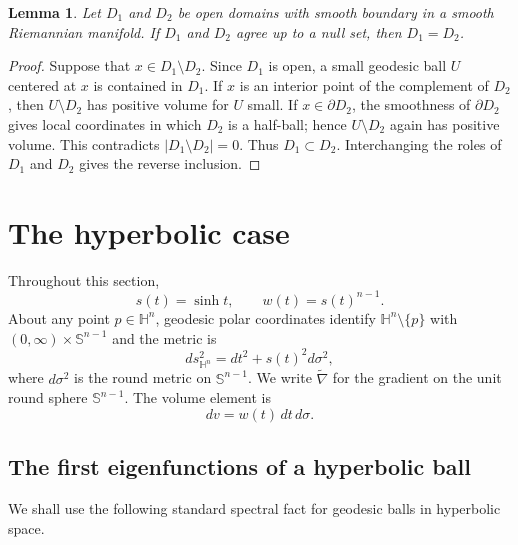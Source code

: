 \documentclass[11pt]{amsart}
\newtheorem{lemma}[theorem]{Lemma}
\theoremstyle{remark}
\newcommand{\HH}{\mathbb H}
\newcommand{\Sn}{\mathbb S}
\begin{document}
\begin{lemma}\label{lem:ae-domain-equality}
Let $D_1$ and $D_2$ be open domains with smooth boundary in a smooth Riemannian manifold.  If $D_1$ and $D_2$ agree up to a null set, then $D_1=D_2$.
\end{lemma}

\begin{proof}
Suppose that $x\in D_1\setminus D_2$.  Since $D_1$ is open, a small geodesic ball $U$ centered at $x$ is contained in $D_1$.  If $x$ is an interior point of the complement of $D_2$, then $U\setminus D_2$ has positive volume for $U$ small.  If $x\in\partial D_2$, the smoothness of $\partial D_2$ gives local coordinates in which $D_2$ is a half-ball; hence $U\setminus D_2$ again has positive volume.  This contradicts $|D_1\setminus D_2|=0$.  Thus $D_1\subset D_2$.  Interchanging the roles of $D_1$ and $D_2$ gives the reverse inclusion.
\end{proof}

\section{The hyperbolic case}\label{sec3}

Throughout this section,
$$
        s(t)=\sinh t,
        \qquad
        w(t)=s(t)^{n-1}.
$$
About any point $p\in\HH^n$, geodesic polar coordinates identify $\HH^n\setminus\{p\}$ with $(0,\infty)\times\Sn^{n-1}$ and the metric is
\begin{equation}\label{eq:hyperbolic-polar-metric}
        ds_{\HH^n}^2=dt^2+s(t)^2d\sigma^2,
\end{equation}
where $d\sigma^2$ is the round metric on $\Sn^{n-1}$.  We write $\widetilde\nabla$ for the gradient on the unit round sphere $\Sn^{n-1}$.  The volume element is
$$
        dv=w(t)\,dt\,d\sigma.
$$

\subsection{The first eigenfunctions of a hyperbolic ball}

We shall use the following standard spectral fact for geodesic balls in hyperbolic space.
\end{document}
